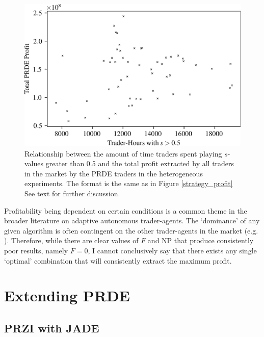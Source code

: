 \documentclass[conference]{IEEEtran}
\begin{document}
\begin{figure}[htbp]
    \centerline{\includegraphics[width=\columnwidth]{ZIP_strategy_profit.png}}
    \caption{
        Relationship between the amount of time traders spent playing $s$-values greater than 0.5 and the total profit extracted by all traders in the market by the PRDE traders in the heterogeneous experiments.
        The format is the same as in Figure \ref{strategy_profit}
        See text for further discussion.
    }
    \label{ZIP_strategy_profit}
\end{figure}

Profitability being dependent on certain conditions is a common theme in the broader literature on adaptive autonomous trader-agents.
The `dominance' of any given algorithm is often contingent on the other trader-agents in the market (e.g. \cite{Vach}).
Therefore, while there are clear values of $F$ and $\mathrm{NP}$ that produce consistently poor results, namely $F=0$, I cannot conclusively say that there exists any single `optimal' combination that will consistently extract the maximum profit.

\section{Extending PRDE}

\subsection{PRZI with JADE}
\end{document}
